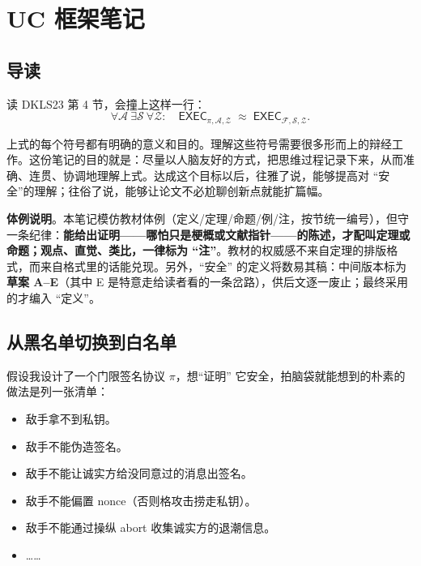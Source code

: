 

\section{UC 框架笔记}
\subsection{导读}

读 DKLS23 第 4 节，会撞上这样一行：
\begin{equation}\label{eq:uc-framework:1}
\forall \mathcal{A}\ \exists \mathcal{S}\ \forall \mathcal{Z}:\quad
\mathsf{EXEC}_{\pi,\mathcal{A},\mathcal{Z}} \;\approx\; \mathsf{EXEC}_{\mathcal{F},\mathcal{S},\mathcal{Z}}.
\end{equation}

上式的每个符号都有明确的意义和目的。理解这些符号需要很多形而上的辩经工作。这份笔记的目的就是：尽量以人脑友好的方式，把思维过程记录下来，从而准确、连贯、协调地理解上式。达成这个目标以后，往雅了说，能够提高对
“安全”的理解；往俗了说，能够让论文不必尬聊创新点就能扩篇幅。

\textbf{体例说明}。本笔记模仿教材体例（定义/定理/命题/例/注，按节统一编号），但守一条纪律：\textbf{能给出证明------哪怕只是梗概或文献指针------的陈述，才配叫定理或命题；观点、直觉、类比，一律标为
“注”}。教材的权威感不来自定理的排版格式，而来自格式里的话能兑现。另外，“安全”
的定义将数易其稿：中间版本标为\textbf{草案 A--E}（其中 E
是特意走给读者看的一条岔路），供后文逐一废止；最终采用的才编入
“定义”。

\subsection{从黑名单切换到白名单}

假设我设计了一个门限签名协议 $\pi$，想“证明”
它安全，拍脑袋就能想到的朴素的做法是列一张清单：

\begin{itemize}

\item
  敌手拿不到私钥。
\item
  敌手不能伪造签名。
\item
  敌手不能让诚实方给没同意过的消息出签名。
\item
  敌手不能偏置 nonce（否则格攻击捞走私钥）。
\item
  敌手不能通过操纵 abort 收集诚实方的退潮信息。
\item
  \ldots\ldots{}
\end{itemize}


